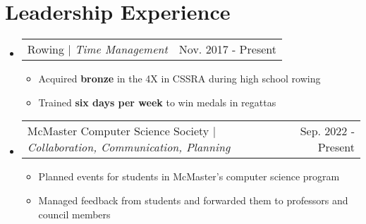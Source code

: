 \documentclass[letterpaper,11pt]{article}
\makeatletter
\newcommand{\resumeItem}[1]{
  \item\small{
    {#1 \vspace{-2pt}}
  }
}
\newcommand{\resumeProjectHeading}[2]{
    \item
    \begin{tabular*}{0.97\textwidth}{l@{\extracolsep{\fill}}r}
      \small#1 & #2 \\
    \end{tabular*}\vspace{-7pt}
}
\newcommand{\resumeSubHeadingListStart}{\begin{itemize}[leftmargin=0.15in, label={}]}
\newcommand{\resumeSubHeadingListEnd}{\end{itemize}}
\newcommand{\resumeItemListStart}{\begin{itemize}}
\newcommand{\resumeItemListEnd}{\end{itemize}\vspace{-5pt}}
\makeatother
\begin{document}
\section{Leadership Experience}
\resumeSubHeadingListStart
	\resumeProjectHeading{Rowing $|$ \emph{Time Management}}{Nov. 2017 - Present}
	\resumeItemListStart
		\resumeItem{Acquired \textbf{bronze} in the 4X in CSSRA during high school rowing}
		\resumeItem{Trained \textbf{six days per week} to win medals in regattas}
	\resumeItemListEnd
	
	\resumeProjectHeading{McMaster Computer Science Society $|$ \emph{Collaboration, Communication, Planning}}{Sep. 2022 - Present}
	\resumeItemListStart
		\resumeItem{Planned events for students in McMaster’s computer science program}
		\resumeItem{Managed feedback from students and forwarded them to professors and council members}
	\resumeItemListEnd
\resumeSubHeadingListEnd

\end{document}
